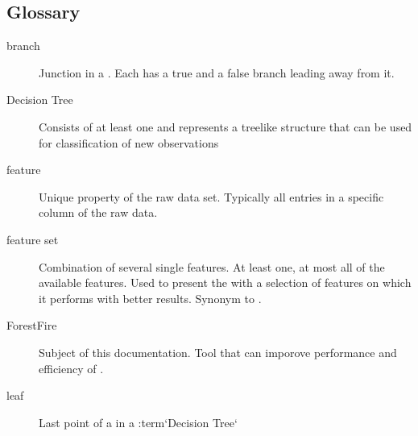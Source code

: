 \documentclass[letterpaper,10pt,english]{sphinxmanual}
\begin{document}
\subsection{Glossary}
\label{\detokenize{Overview:glossary}}\begin{description}
\item[{branch}] \leavevmode{}\label{\detokenize{Overview:term-branch}}
Junction in a {\hyperref[\detokenize{Overview:term-decision-tree}]{}}. Each {\hyperref[\detokenize{Overview:term-node}]{}} has a true and a false branch leading away from it.

\item[{Decision Tree}] \leavevmode{}\label{\detokenize{Overview:term-decision-tree}}
Consists of at least one {\hyperref[\detokenize{Overview:term-node}]{}} and represents a treelike structure that can be used for classification of new observations

\item[{feature}] \leavevmode{}\label{\detokenize{Overview:term-feature}}
Unique property of the raw data set.
Typically all entries in a specific column of the raw data.

\item[{feature set}] \leavevmode{}\label{\detokenize{Overview:term-feature-set}}
Combination of several single features.
At least one, at most all of the available features.
Used to present the {\hyperref[\detokenize{Overview:term-machine-learning-algorithm}]{}} with a selection of features on which it performs with better results.
Synonym to {\hyperref[\detokenize{Overview:term-observation}]{}}.

\item[{ForestFire}] \leavevmode{}\label{\detokenize{Overview:term-forestfire}}
Subject of this documentation.
Tool that can imporove performance and efficiency of {\hyperref[\detokenize{Overview:term-machine-learning-algorithm}]{}}.

\item[{leaf}] \leavevmode{}\label{\detokenize{Overview:term-leaf}}
Last point of a {\hyperref[\detokenize{Overview:term-branch}]{}} in a :term{}`Decision Tree{}`


\end{description}
\end{document}
